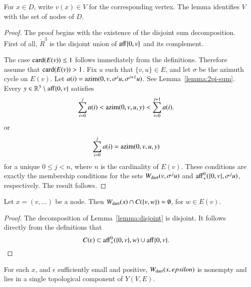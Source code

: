 For $x\in D$, write $v(x)\in V$ for the corresponding vertex.  The lemma identifies $V$ with the set of nodes of $D$.

\begin{proof}
The proof begins with the existence of the disjoint sum decomposition.
First of all, $\ring{R}^3$ is the disjoint union of ${\operatorname{aff}}\{0,v\}$
and its complement.

The case ${\operatorname{card}}(E(v))\le 1$ follows immediately from the definitions.  
Therefore assume  that ${\operatorname{card}}(E(v)) >1$.
Fix $u$ such that $\{v,u\}\in E$, and let $\sigma$ be the azimuth
cycle on $E(v)$.  Let $a(i)={\operatorname{azim}}(0,v,\sigma^i u,\sigma^{i+1}u)$.   See Lemma~\ref{lemma:2pi-sum}.  Every $y\in\mathbb{R}^3\setminus{\operatorname{aff}}\{0,v\}$ satisfies
$$
\sum_{i=0}^j a(i) <
{\operatorname{azim}}(0,v,u,y) < \sum_{i=0}^{j+1} a(i).
$$
or 
$$
\sum_{i=0}^j a(i) = {\operatorname{azim}}(0,v,u,y)
$$
for a unique $0 \le j < n$, where $n$ is the cardinality of $E(v)$. 
These conditions are exactly the membership conditions for the sets
$
W_{\text{dart}}(v,\sigma^j u)
$
and ${\operatorname{aff}}_+^0(\{0,v\},\sigma^j u)$, respectively.
The result follows.
\end{proof}

\begin{corollary}
Let $x = (v,\ldots)$ be a node.
Then $W_{\text{dart}}(x)\cap C(\{v,w\})=\emptyset$, for $w\in E(v)$.
\end{corollary}

\begin{proof} The decomposition of Lemma~\ref{lemma:disjoint} is
disjoint.  It follows directly from the definitions that
   $$C(\e)\subset \op{aff}_+^0(\{\orz,v\},w) \cup 
    \op{aff}\{\orz,v\}.$$
\end{proof}

\begin{lemma} 
For each $x$, and $\epsilon$ sufficiently small and positive,
$W_{\text{dart}}(x,epsilon)$ is nonempty and lies in a single 
topological component of $Y(V,E)$.
\end{lemma}

